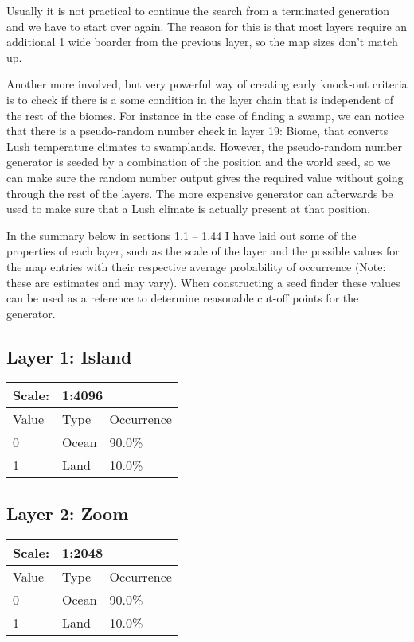 \documentclass{article}
\begin{document}
	Usually it is not practical to continue the search from a terminated generation and we have to start over again. The reason for this is that most layers require an additional 1 wide boarder from the previous layer, so the map sizes don't match up.
	
	Another more involved, but very powerful way of creating early knock-out criteria is to check if there is a some condition in the layer chain that is independent of the rest of the biomes. For instance in the case of finding a swamp, we can notice that there is a pseudo-random number check in layer 19: Biome, that converts Lush temperature climates to swamplands. However, the pseudo-random number generator is seeded by a combination of the position and the world seed, so we can make sure the random number output gives the required value without going through the rest of the layers. The more expensive generator can afterwards be used to make sure that a Lush climate is actually present at that position.
	
	
	In the summary below in sections 1.1 -- 1.44 I have laid out some of the properties of each layer, such as the scale of the layer and the possible values for the map entries with their respective average probability of occurrence (Note: these are estimates and may vary). When constructing a seed finder these values can be used as a reference to determine reasonable cut-off points for the generator.
	
	
	
	
	
	\subsection{Layer 1: Island}
	\begin{tabular}{|l|l|l|}\hline
		Scale: & \multicolumn{2}{|l|}{1:4096} \\\hline\hline
		Value  & Type   & Occurrence \\\hline
		0      & Ocean  & 90.0\%\\\hline
		1      & Land   & 10.0\%\\\hline
	\end{tabular}
	
	\subsection{Layer 2: Zoom}
	\begin{tabular}{|l|l|l|}\hline
		Scale: & \multicolumn{2}{|l|}{1:2048} \\\hline\hline
		Value  & Type   & Occurrence \\\hline
		0      & Ocean  & 90.0\%\\\hline
		1      & Land   & 10.0\%\\\hline
	\end{tabular}
	
\end{document}
